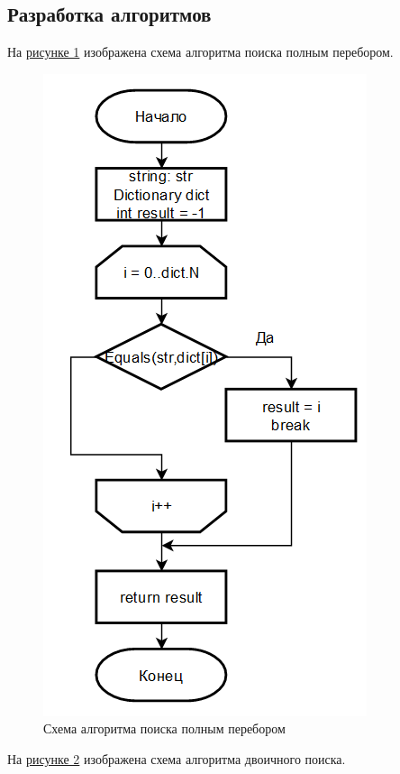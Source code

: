 \documentclass[14pt, a4paper]{extarticle}
\begin{document}
\subsection{Разработка алгоритмов}
На \hyperref[Schema1]{рисунке 1} изображена схема алгоритма поиска полным перебором.
\begin{figure}[h!]
	\centering
	\includegraphics[scale=0.9]{source/alg1.png}
	\caption{Схема алгоритма поиска полным перебором}
	\label{Schema1}
\end{figure}
\clearpage
На \hyperref[Schema2]{рисунке 2} изображена схема алгоритма двоичного поиска.
\end{document}
